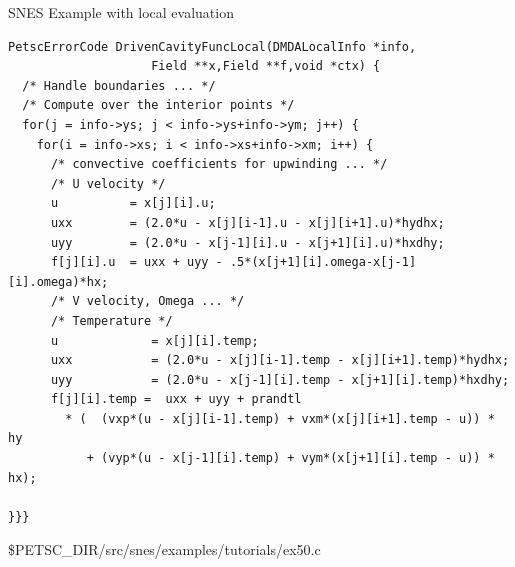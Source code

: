 \begin{frame}[fragile]{SNES Example with local evaluation}
\begin{verbatim}
PetscErrorCode DrivenCavityFuncLocal(DMDALocalInfo *info,
                    Field **x,Field **f,void *ctx) {
  /* Handle boundaries ... */
  /* Compute over the interior points */
  for(j = info->ys; j < info->ys+info->ym; j++) {
    for(i = info->xs; i < info->xs+info->xm; i++) {
      /* convective coefficients for upwinding ... */
      /* U velocity */
      u          = x[j][i].u;
      uxx        = (2.0*u - x[j][i-1].u - x[j][i+1].u)*hydhx;
      uyy        = (2.0*u - x[j-1][i].u - x[j+1][i].u)*hxdhy;
      f[j][i].u  = uxx + uyy - .5*(x[j+1][i].omega-x[j-1][i].omega)*hx;
      /* V velocity, Omega ... */
      /* Temperature */
      u             = x[j][i].temp;
      uxx           = (2.0*u - x[j][i-1].temp - x[j][i+1].temp)*hydhx;
      uyy           = (2.0*u - x[j-1][i].temp - x[j+1][i].temp)*hxdhy;
      f[j][i].temp =  uxx + uyy + prandtl
        * (  (vxp*(u - x[j][i-1].temp) + vxm*(x[j][i+1].temp - u)) * hy
           + (vyp*(u - x[j-1][i].temp) + vym*(x[j+1][i].temp - u)) * hx);

}}}
\end{verbatim}

\begin{center}\small
\$PETSC\_DIR/src/snes/examples/tutorials/ex50.c
\end{center}
\end{frame}
